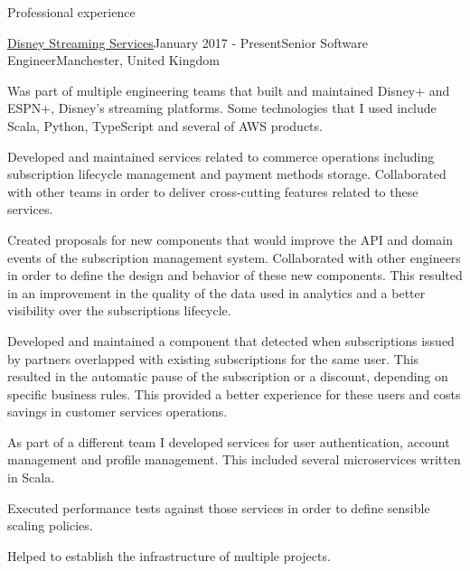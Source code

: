 \documentclass{resume} %
\begin{document}
\begin{rSection}{Professional experience}

\begin{rSubsection}{\href{https://www.disneystreaming.com/}{Disney Streaming Services}}{January 2017 - Present}{Senior Software Engineer}{Manchester, United Kingdom}
\begin{rList}
\item Was part of multiple engineering teams that built and maintained Disney+ and ESPN+, Disney's streaming platforms. Some technologies that I used include Scala, Python, TypeScript and several of AWS products.  
\item Developed and maintained services related to commerce operations including subscription lifecycle management and payment methods storage. Collaborated with other teams in order to deliver cross-cutting features related to these services.
\begin{rSublist}
  \item Created proposals for new components that would improve the API and domain events of the subscription management system. Collaborated with other engineers in order to define the design and behavior of these new components. This resulted in an improvement in the quality of the data used in analytics and a better visibility over the subscriptions lifecycle.
  \item Developed and maintained a component that detected when subscriptions issued by partners overlapped with existing subscriptions for the same user. This resulted in the automatic pause of the subscription or a discount, depending on specific business rules. This provided a better experience for these users and costs savings in customer services operations.
\end{rSublist}
\item As part of a different team I developed services for user authentication, account management and profile management. This included several microservices written in Scala.
\begin{rSublist}
\item Executed performance tests against those services in order to define sensible scaling policies.
\item Helped to establish the infrastructure of multiple projects.
\end{rSublist}
\end{rList}
\end{rSubsection}


\end{rSection}
\end{document}
